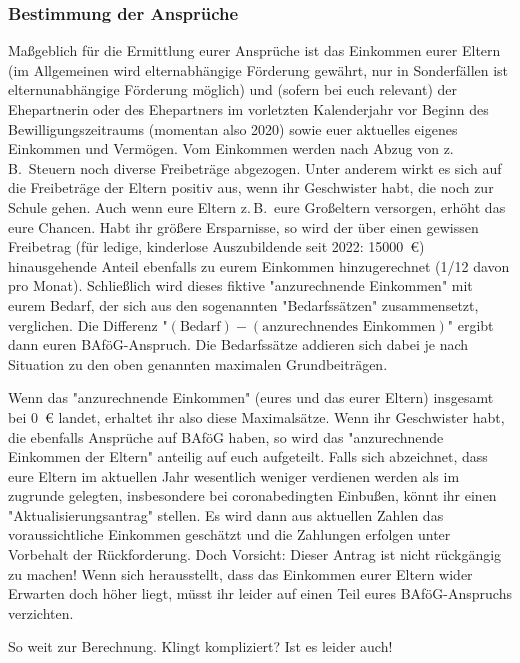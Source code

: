 \begin{multicols}{2}
\subsubsection{Bestimmung der Ansprüche}
Maßgeblich für die Ermittlung eurer Ansprüche ist das Einkommen eurer Eltern (im Allgemeinen wird elternabhängige Förderung gewährt, nur in Sonderfällen ist elternunabhängige Förderung möglich) und (sofern bei euch relevant) der Ehepartnerin oder des Ehepartners im vorletzten Kalenderjahr vor Beginn des Bewilligungszeitraums (momentan also 2020) sowie euer aktuelles eigenes Einkommen und Vermögen.
Vom Einkommen werden nach Abzug von z.\,B.\ Steuern noch diverse Freibeträge abgezogen.
Unter anderem wirkt es sich auf die Freibeträge der Eltern positiv aus, wenn ihr Geschwister habt, die noch zur Schule gehen.
Auch wenn eure Eltern z.\,B.\ eure Großeltern versorgen, erhöht das eure Chancen.
Habt ihr größere Ersparnisse, so wird der über einen gewissen Freibetrag (für ledige, kinderlose Auszubildende seit 2022: \SI{15000}{\euro}) hinausgehende Anteil ebenfalls zu eurem Einkommen hinzugerechnet (1/12 davon pro Monat).
Schließlich wird dieses fiktive "anzurechnende Einkommen" mit eurem Bedarf, der sich aus den sogenannten "Bedarfssätzen" zusammensetzt, verglichen.
Die Differenz "$(\text{Bedarf}) - (\text{anzurechnendes Einkommen})$" ergibt dann euren BAföG-Anspruch.
Die Bedarfssätze addieren sich dabei je nach Situation zu den oben genannten maximalen Grundbeiträgen.

Wenn das "anzurechnende Einkommen" (eures und das eurer Eltern) insgesamt bei \SI{0}{\euro} landet, erhaltet ihr also diese Maximalsätze.
Wenn ihr Geschwister habt, die ebenfalls Ansprüche auf BAföG haben, so wird das "anzurechnende Einkommen der Eltern" anteilig auf euch aufgeteilt.
Falls sich abzeichnet, dass eure Eltern im aktuellen Jahr wesentlich weniger verdienen werden als im zugrunde gelegten, insbesondere bei coronabedingten Einbußen, könnt ihr einen "Aktualisierungsantrag" stellen.
Es wird dann aus aktuellen Zahlen das voraussichtliche Einkommen geschätzt und die Zahlungen erfolgen unter Vorbehalt der Rückforderung.
Doch Vorsicht: Dieser Antrag ist nicht rückgängig zu machen! Wenn sich herausstellt, dass das Einkommen eurer Eltern wider Erwarten doch höher liegt, müsst ihr leider auf einen Teil eures BAföG-Anspruchs verzichten.

So weit zur Berechnung.
Klingt kompliziert? Ist es leider auch!


\end{multicols}
